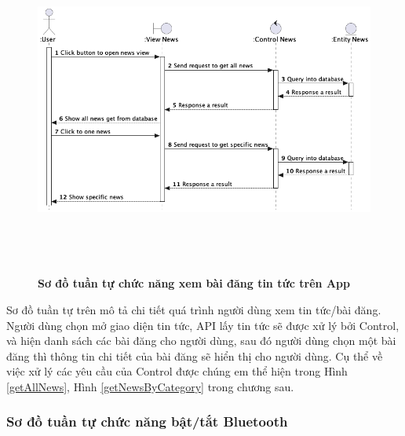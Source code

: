   \begin{figure}[H]
        \centering
        \includegraphics[width=16cm,height=11cm]{Images/mobile_app/view_news.png}
        \caption[ Sơ đồ tuần tự chức năng xem bài đăng tin tứctrên App]{\bfseries \fontsize{12pt}{0pt}
        \selectfont Sơ đồ tuần tự chức năng xem bài đăng tin tức trên App}
        \label{view_news} %
  \end{figure}

  Sơ đồ tuần tự trên mô tả chi tiết quá trình người dùng xem tin tức/bài đăng. Người dùng chọn mở giao diện tin tức, API lấy tin tức sẽ
  được xử lý bởi Control, và hiện danh sách các bài đăng cho người dùng, sau đó người dùng chọn một bài đăng thì thông tin chi tiết
  của bài đăng sẽ hiển thị cho người dùng. Cụ thể về việc xử lý các yêu cầu của Control được chúng em thể hiện trong 
  Hình \ref{getAllNews}, Hình \ref{getNewsByCategory} trong chương sau.

\subsubsection{Sơ đồ tuần tự chức năng bật/tắt Bluetooth}
\mbox{}

